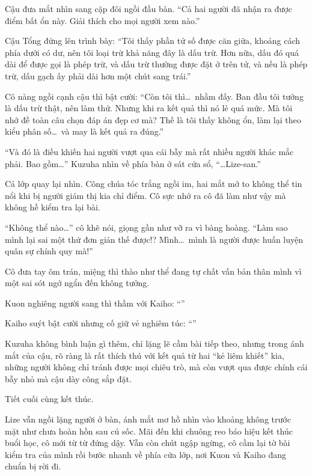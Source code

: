 \documentclass[../main.tex]{subfiles}
\begin{document}
Cậu đưa mắt nhìn sang cặp đôi ngồi đầu bàn. ``Cả hai người đã nhận ra được điểm bất ổn này. Giải thích cho mọi người xem nào.''

Cậu Tổng đứng lên trình bày: ``Tôi thấy phần tử số được căn giữa, khoảng cách phía dưới có dư, nên tôi loại trừ khả năng đây là dấu trừ. Hơn nữa, dấu đó quá dài để được gọi là phép trừ, và dấu trừ thường được đặt ở trên tử, và nếu là phép trừ, dấu gạch ấy phải dài hơn một chút sang trái.''

Cô nàng ngồi cạnh cậu thì bật cười: ``Còn tôi thì\dots\ nhầm đấy. Ban đầu tôi tưởng là dấu trừ thật, nên làm thử. Nhưng khi ra kết quả thì nó lẻ quá mức. Mà tôi nhớ đề toàn câu chọn đáp án đẹp cơ mà? Thế là tôi thấy không ổn, làm lại theo kiểu phân số\dots\ và may là kết quả ra đúng.''

``Và đó là điều khiến hai người vượt qua cái bẫy mà rất nhiều người khác mắc phải. Bao gồm\dots'' Kuzuha nhìn về phía bàn ở sát cửa sổ, ``\dots Lize-san.''

Cả lớp quay lại nhìn. Công chúa tóc trắng ngồi im, hai mắt mở to không thể tin nổi khi bị người giám thị kia chỉ điểm. Cô sực nhớ ra cô đã làm như vậy mà không hề kiểm tra lại bài.

``Không thể nào\dots'' cô khẽ nói, giọng gần như vỡ ra vì bàng hoàng. ``Làm sao mình lại sai một thứ đơn giản thế được!? Mình\dots\ mình là người được huấn luyện quân sự chính quy mà!''

Cô đưa tay ôm trán, miệng thì thào như thể đang tự chất vấn bản thân mình vì một sai sót ngớ ngẩn đến không tưởng.

Kuon nghiêng người sang thì thầm với Kaiho: ``''

Kaiho suýt bật cười nhưng cố giữ vẻ nghiêm túc: ``''

Kuzuha không bình luận gì thêm, chỉ lặng lẽ cầm bài tiếp theo, nhưng trong ánh mắt của cậu, rõ ràng là rất thích thú với kết quả từ hai ``kẻ liêm khiết'' kia, những người không chỉ tránh được mọi chiêu trò, mà còn vượt qua được chính cái bẫy nhỏ mà cậu dày công sắp đặt.

\omk

Tiết cuối cùng kết thúc.

Lize vẫn ngồi lặng người ở bàn, ánh mắt mơ hồ nhìn vào khoảng không trước mặt như chưa hoàn hồn sau cú sốc. Mãi đến khi chuông reo báo hiệu kết thúc buổi học, cô mới từ từ đứng dậy. Vẫn còn chút ngập ngừng, cô cầm lại tờ bài kiểm tra của mình rồi bước nhanh về phía cửa lớp, nơi Kuon và Kaiho đang chuẩn bị rời đi.
\end{document}
